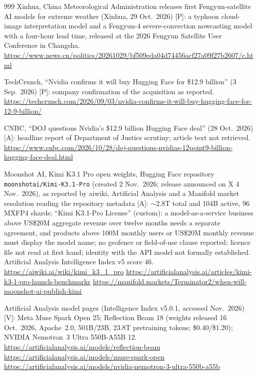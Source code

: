 \begin{thebibliography}{999}
 Xinhua, China Meteorological Administration releases first Fengyun-satellite AI models for extreme weather (Xinhua, 29 Oct.\ 2026) [P]: a typhoon cloud-image interpretation model and a Fengyun-4 severe-convection nowcasting model with a four-hour lead time, released at the 2026 Fengyun Satellite User Conference in Changsha. \url{https://www.news.cn/politics/20261029/bf509eda04d74456acf27a09f27b2607/c.html}

 TechCrunch, ``Nvidia confirms it will buy Hugging Face for \$12.9 billion'' (3 Sep.\ 2026) [P]: company confirmation of the acquisition as reported. \url{https://techcrunch.com/2026/09/03/nvidia-confirms-it-will-buy-hugging-face-for-12-9-billion/}

 CNBC, ``DOJ questions Nvidia's \$12.9 billion Hugging Face deal'' (28 Oct.\ 2026) [A]: headline report of Department of Justice scrutiny; article text not retrieved. \url{https://www.cnbc.com/2026/10/28/doj-questions-nvidias-12point9-billion-hugging-face-deal.html}

 Moonshot AI, Kimi K3.1 Pro open weights, Hugging Face repository \texttt{moonshotai/Kimi-K3.1-Pro} (created 2 Nov.\ 2026; release announced on X 4 Nov.\ 2026), as reported by aiwiki, Artificial Analysis and a Manifold market resolution reading the repository metadata [A]: $\sim$2.8T total and 104B active, 96 MXFP4 shards; ``Kimi K3.1-Pro License'' (custom): a model-as-a-service business above US\$20M aggregate revenue over twelve months needs a separate agreement, and products above 100M monthly users or US\$20M monthly revenue must display the model name; no geofence or field-of-use clause reported; licence file not read at first hand; identity with the API model not formally established. Artificial Analysis Intelligence Index v5 score 46. \url{https://aiwiki.ai/wiki/kimi_k3_1_pro} \url{https://artificialanalysis.ai/articles/kimi-k3-1-pro-launch-benchmarks} \url{https://manifold.markets/Terminator2/when-will-moonshot-ai-publish-kimi}

 Artificial Analysis model pages (Intelligence Index v5.0.1, accessed Nov.\ 2026) [V]: Meta Muse Spark Open 25; Reflection Beam 18 (weights released 16 Oct.\ 2026, Apache~2.0, 501B/23B, 23.8T pretraining tokens; \$0.40/\$1.20); NVIDIA Nemotron~3 Ultra 550B-A55B 12. \url{https://artificialanalysis.ai/models/reflection-beam} \url{https://artificialanalysis.ai/models/muse-spark-open} \url{https://artificialanalysis.ai/models/nvidia-nemotron-3-ultra-550b-a55b}


\end{thebibliography}
